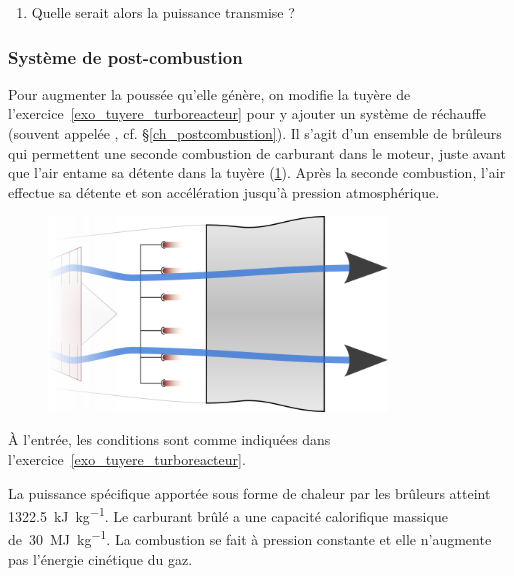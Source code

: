 	\begin{enumerate}
		\item Quelle serait alors la puissance transmise ?
	\end{enumerate}


\subsubsection{Système de post-combustion}
\label{exo_postcombustion}

	Pour augmenter la poussée qu’elle génère, on modifie la tuyère de l’exercice~\ref{exo_tuyere_turboreacteur} pour y ajouter un système de réchauffe (souvent appelée , cf. \S\ref{ch_postcombustion}). Il s’agit d’un ensemble de brûleurs qui permettent une seconde combustion de carburant dans le moteur, juste avant que l’air entame sa détente dans la tuyère (\cref{fig_afterburner}). Après la seconde combustion, l’air effectue sa détente et son accélération jusqu’à pression atmosphérique.

	\begin{figure}
		\begin{center}
			\includegraphics[width=9cm, max width=0.8\columnwidth]{images/postcombustion.png}
		\end{center}
		\label{fig_afterburner}
	\end{figure}

	À l’entrée, les conditions sont comme indiquées dans l’exercice~\ref{exo_tuyere_turboreacteur}.
	
	La puissance spécifique apportée sous forme de chaleur par les brûleurs atteint \SI{1322,5}{\kilo\joule\per\kilogram}. Le carburant brûlé a une capacité calorifique massique de~\SI{30}{\mega\joule\per\kilogram}. La combustion se fait à pression constante et elle n’augmente pas l’énergie cinétique du gaz.
	
